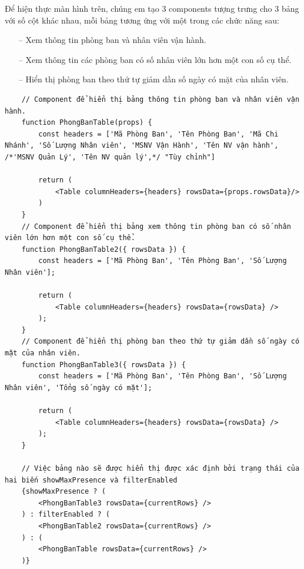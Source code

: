 \newpage
Để hiện thực màn hình trên, chúng em tạo 3 components tượng trưng cho 3 bảng với số cột khác nhau, mỗi bảng tương ứng với một trong các chức năng sau:
\begin{itemize}
    \item [--] Xem thông tin phòng ban và nhân viên vận hành.
    \item [--] Xem thông tin các phòng ban có số nhân viên lớn hơn một con số cụ thể.
    \item [--] Hiển thị phòng ban theo thứ tự giảm dần số ngày có mặt của nhân viên.
\end{itemize}
\begin{verbatim}
    // Component để hiển thị bảng thông tin phòng ban và nhân viên vận hành.
    function PhongBanTable(props) {
        const headers = ['Mã Phòng Ban', 'Tên Phòng Ban', 'Mã Chi Nhánh', 'Số Lượng Nhân viên', 'MSNV Vận Hành', 'Tên NV vận hành', /*'MSNV Quản Lý', 'Tên NV quản lý',*/ "Tùy chỉnh"]

        return (
            <Table columnHeaders={headers} rowsData={props.rowsData}/>
        )
    }
    // Component để hiển thị bảng xem thông tin phòng ban có số nhân viên lớn hơn một con số cụ thể.
    function PhongBanTable2({ rowsData }) {
        const headers = ['Mã Phòng Ban', 'Tên Phòng Ban', 'Số Lượng Nhân viên'];

        return (
            <Table columnHeaders={headers} rowsData={rowsData} />
        );
    }
    // Component để hiển thị phòng ban theo thứ tự giảm dần số ngày có mặt của nhân viên.
    function PhongBanTable3({ rowsData }) {
        const headers = ['Mã Phòng Ban', 'Tên Phòng Ban', 'Số Lượng Nhân viên', 'Tổng số ngày có mặt'];

        return (
            <Table columnHeaders={headers} rowsData={rowsData} />
        );
    }

    // Việc bảng nào sẽ được hiển thị được xác định bởi trạng thái của hai biến showMaxPresence và filterEnabled
    {showMaxPresence ? (
        <PhongBanTable3 rowsData={currentRows} />
    ) : filterEnabled ? (
        <PhongBanTable2 rowsData={currentRows} />
    ) : (
        <PhongBanTable rowsData={currentRows} />
    )}
\end{verbatim}

